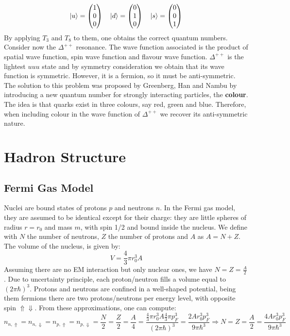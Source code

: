 \documentclass[10.75pt,a4paper,openright,bottom=2cm]{article}
\begin{document}
\[
\ket{u}=\begin{pmatrix}
    1 \\ 0 \\ 0
\end{pmatrix} \quad \ket{d}=\begin{pmatrix}
    0 \\ 1 \\ 0
\end{pmatrix} \quad \ket{s}=\begin{pmatrix}
    0 \\ 0 \\ 1
\end{pmatrix}
\]
By applying $T_3$ and $T_8$ to them, one obtains the correct quantum numbers.\\
Consider now the $\Delta^{++}$ resonance. The wave function associated is the product of spatial wave function, spin wave function and flavour wave function. $\Delta^{++}$ is the lightest $uuu$ state and by symmetry consideration we obtain that its wave function is symmetric. However, it is a fermion, so it must be anti-symmetric. The solution to this problem was proposed by Greenberg, Han and Nambu by introducing a new quantum number for strongly interacting particles, the \textbf{colour}. The idea is that quarks exist in three colours, say red, green and blue. Therefore, when including colour in the wave function of $\Delta^{++}$ we recover its anti-symmetric nature. 
\section{Hadron Structure}
\subsection{Fermi Gas Model}
Nuclei are bound states of protons $p$ and neutrons $n$. In the Fermi gas model, they are assumed to be identical except for their charge: they are little spheres of radius $r=r_0$ and mass $m$, with spin 1/2 and bound inside the nucleus. We define with $N$ the number of neutrons, $Z$ the number of protons and $A$ as $A=N+Z$. The volume of the nucleus, is given by:
\[
V=\frac{4}{3}\pi r_0^3A
\]
Assuming there are no EM interaction but only nuclear ones, we have $N=Z=\frac{A}{2}$. Due to uncertainty principle, each proton/neutron fills a volume equal to $(2\pi\hbar)^3$. Protons and neutrons are confined in a well-shaped potential, being them fermions there are two protons/neutrons per energy level, with opposite spin $\Uparrow\Downarrow$. From these approximations, one can compute:
\[
n_{n,\Uparrow}=n_{n,\Downarrow}=n_{p,\Uparrow}=n_{p,\Downarrow}=\frac{N}{2}=\frac{Z}{2}=\frac{A}{4}=\frac{\frac{4}{3}\pi r_0^3A\frac{4}{3}\pi p_F^3}{(2\pi\hbar)^3}=\frac{2Ar_0^3p_F^3}{9\pi\hbar^3}\Rightarrow N=Z=\frac{A}{2}=\frac{4Ar_0^3p_F^3}{9\pi\hbar^3}
\]
\end{document}
